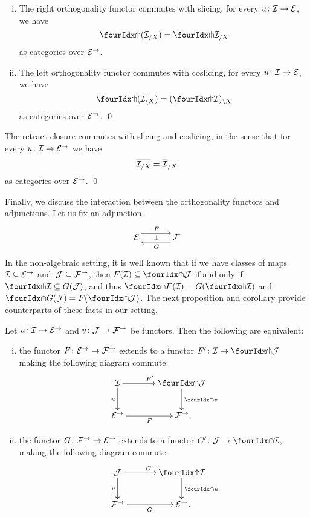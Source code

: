 \documentclass[reqno,10pt,a4paper,oneside,draft]{amsart}
\begin{document}
\begin{proposition} \label{pitchfork-slicing}
\hfill
\begin{enumerate}[(i)]
\item The right orthogonality functor commutes with slicing, \ie for every $u \co \cal{I} \to \cal{E}$, we have
\[
  \liftr{(\cal{I}_{/X})} = \liftr{\cal{I}}_{/X} 
\]
as categories over $\cal{E}^\to$.
\item The left orthogonality functor commutes with coslicing, \ie for every $u \co \cal{I} \to \cal{E}$, we have
\[
  \liftl{(\cal{I}_{\backslash X})} = (\liftl{\cal{I}})_{ \backslash X}
\]
as categories over $\cal{E}^\to$. \qed
\end{enumerate}
\end{proposition}



\begin{proposition} The retract closure commutes with slicing and coslicing, in the sense that for every $u \co \cal{I} \to \cal{E}^\to$ we have 
\[
\overline{\cal{I}_{/X}} = \overline{\cal{I}}_{/X}
\]
as categories over $\cal{E}^\to$. \qed
\end{proposition}




Finally, we discuss the interaction between the orthogonality functors and adjunctions. Let us fix 
an adjunction
\[
\xymatrix@C+1em{
  \cal{E}
  \ar@<5pt>[r]^{F}
  \ar@{}[r]|{\bot}
&
  \cal{F}
  \ar@<5pt>[l]^{G}
}
\]
In the non-algebraic setting, it is well known that if we have classes of maps $\cal{I} \subseteq \cal{E}^\to$ and~$\cal{J} \subseteq \cal{F}^\to$, then $F(\cal{I}) \subseteq \liftl{\cal{J}}$ if and only if $\liftr{\cal{I}} \subseteq G(\cal{J})$, and thus $\liftr{F(\cal{I})} = G(\liftr{\cal{I}})$ and $\liftl{G(\cal{J})} = F(\liftl{\cal{J}})$. The next proposition and corollary provide counterparts of these facts in our setting.

\begin{proposition} \label{lift-of-adjunction}
Let $u \co \cal{I} \to \cal{E}^\to$ and $v \co \cal{J} \to \cal{F}^\to$ be functors. Then the following are equivalent:
\begin{enumerate}[(i)]
\item the functor $F \co \cal{E}^\to \to \cal{F}^\to$ extends to a functor $F' \co \cal{I} \to \liftl{\cal{J}}$ making the following diagram commute:
\[
\xymatrix@C=1.2cm{
  \cal{I}
  \ar[r]^{F'}
  \ar[d]_{u}
&
  \liftl{\cal{J}}
  \ar[d]^{\liftl{v}}
\\
  \cal{E}^\to
  \ar[r]_-{F}
&
  \cal{F}^\to
\rlap{,}}
\]
\item the functor $G \co \cal{F}^\to \to \cal{E}^\to$ extends to a functor $G' \co \cal{J} \to \liftr{\cal{I}}$, making the following diagram commute:
\[
\xymatrix@C=1.2cm{
  \cal{J}
    \ar[d]_{v}
\ar[r]^{G'}
& 
  \liftr{\cal{I}}
  \ar[d]^{\liftr{u}}
\\
  \cal{F}^\to
   \ar[r]_{G}
&
  \cal{E}^\to
\rlap{.}}
\]
\end{enumerate}
\end{proposition}
\end{document}
